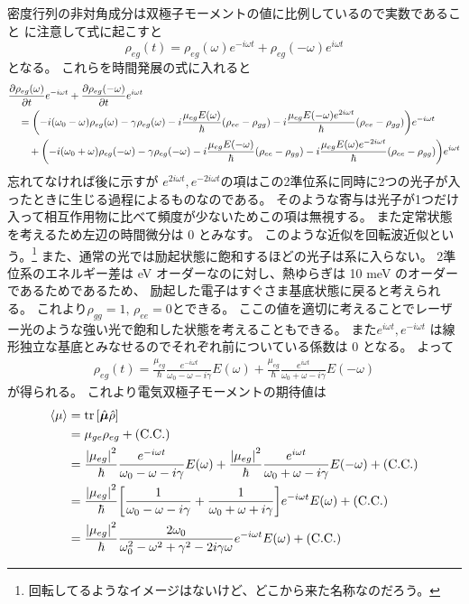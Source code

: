 \documentclass[11pt,dvipdfmx,a4paper]{jsarticle}
\newcommand{\cc}{\text{(C.C.)}}
\begin{document}
密度行列の非対角成分は双極子モーメントの値に比例しているので実数であること
に注意して式に起こすと
\begin{equation}
	\rho_{eg}(t) = \rho_{eg}( \omega) e^{-i\omega t} + \rho_{eg}(-\omega) e^{ i\omega t}
\end{equation}
となる。
これらを時間発展の式に入れると
\begin{align}
	&\pdv{\rho_{eg}(\omega)}{t}e^{-i\omega t} + \pdv{\rho_{eg}(-\omega)}{t}e^{i\omega t} \notag\\
	  &\quad = \qty(-i(\omega_0-\omega)\rho_{eg}( \omega) -\gamma\rho_{eg}( \omega) -i\frac{\mu_{eg}E( \omega)}{\hbar}(\rho_{ee}-\rho_{gg})-i\frac{\mu_{eg}E(-\omega)e^{ 2i\omega t}}{\hbar}(\rho_{ee}-\rho_{gg}))e^{-i\omega t} \notag\\
	  &\qquad + \qty(-i(\omega_0+\omega)\rho_{eg}(-\omega) -\gamma\rho_{eg}(-\omega) -i\frac{\mu_{eg}E(-\omega)}{\hbar}(\rho_{ee}-\rho_{gg})-i\frac{\mu_{eg}E( \omega)e^{-2i\omega t}}{\hbar}(\rho_{ee}-\rho_{gg}))e^{ i\omega t}
\end{align}
忘れてなければ後に示すが
\(e^{2i\omega t}, e^{-2i\omega t}\)の項はこの2準位系に同時に2つの光子が入ったときに生じる過程によるものなのである。
そのような寄与は光子が1つだけ入って相互作用物に比べて頻度が少ないためこの項は無視する。
また定常状態を考えるため左辺の時間微分は 0 とみなす。
このような近似を回転波近似という。\footnote{回転してるようなイメージはないけど、どこから来た名称なのだろう。}
また、通常の光では励起状態に飽和するほどの光子は系に入らない。
2準位系のエネルギー差は eV オーダーなのに対し、熱ゆらぎは 10 meV のオーダーであるためであるため、
励起した電子はすぐさま基底状態に戻ると考えられる。
これより\(\rho_{gg} = 1,\,\rho_{ee} = 0\)とできる。
ここの値を適切に考えることでレーザー光のような強い光で飽和した状態を考えることもできる。
また\(e^{i\omega t}, e^{-i\omega t}\) は線形独立な基底とみなせるのでそれぞれ前についている係数は 0 となる。
よって
\begin{align}
	\rho_{eg}(t)
	= \frac{\mu_{eg}}{\hbar}\frac{e^{-i\omega t}}{\omega_0 - \omega - i\gamma} E( \omega)
	+ \frac{\mu_{eg}}{\hbar}\frac{e^{ i\omega t}}{\omega_0 + \omega - i\gamma} E(-\omega)
\end{align}
が得られる。
これより電気双極子モーメントの期待値は
\begin{align}
	\ev{\mu} &= \tr\qty[\hat{\vb*{\mu}}\hat{\rho}]\\
	&=\mu_{ge}\rho_{eg}+\cc\\
	&=\frac{\abs{\mu_{eg}}^2}{\hbar}\frac{e^{-i\omega t}}{\omega_0 - \omega - i\gamma} E( \omega)
	+ \frac{\abs{\mu_{eg}}^2}{\hbar}\frac{e^{ i\omega t}}{\omega_0 + \omega - i\gamma} E(-\omega)
	+ \cc\\
	&=\frac{\abs{\mu_{eg}}^2}{\hbar}\qty[
		 \frac{1}{\omega_0 - \omega - i\gamma}
		+\frac{1}{\omega_0 + \omega + i\gamma}]
	e^{-i\omega t}E(\omega) + \cc\\
	&=\frac{\abs{\mu_{eg}}^2}{\hbar}
	\frac{2\omega_0}{\omega_0^2-\omega^2 + \gamma^2 -2i\gamma\omega}
	e^{-i\omega t} E(\omega) + \cc
\end{align}
\end{document}
